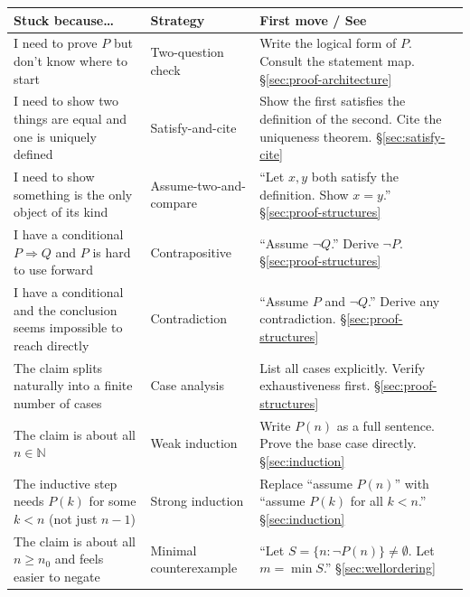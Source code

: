 \begin{center}
\renewcommand{\arraystretch}{1.6}
\begin{tabular}{p{} p{} p{}}
\toprule
\textbf{Stuck because\ldots} &
\textbf{Strategy} &
\textbf{First move / See} \\
\midrule

I need to prove $P$ but don't know where to start &
  Two-question check &
  Write the logical form of $P$. Consult the statement map.
  \S\ref{sec:proof-architecture} \\

I need to show two things are equal and one is uniquely defined &
  Satisfy-and-cite &
  Show the first satisfies the definition of the second.
  Cite the uniqueness theorem.
  \S\ref{sec:satisfy-cite} \\

I need to show something is the only object of its kind &
  Assume-two-and-compare &
  ``Let $x, y$ both satisfy the definition. Show $x = y$.''
  \S\ref{sec:proof-structures} \\

I have a conditional $P \Rightarrow Q$ and $P$ is hard to use forward &
  Contrapositive &
  ``Assume $\neg Q$.'' Derive $\neg P$.
  \S\ref{sec:proof-structures} \\

I have a conditional and the conclusion seems impossible to reach directly &
  Contradiction &
  ``Assume $P$ and $\neg Q$.'' Derive any contradiction.
  \S\ref{sec:proof-structures} \\

The claim splits naturally into a finite number of cases &
  Case analysis &
  List all cases explicitly. Verify exhaustiveness first.
  \S\ref{sec:proof-structures} \\

The claim is about all $n \in \mathbb{N}$ &
  Weak induction &
  Write $P(n)$ as a full sentence. Prove the base case directly.
  \S\ref{sec:induction} \\

The inductive step needs $P(k)$ for some $k < n$ (not just $n-1$) &
  Strong induction &
  Replace ``assume $P(n)$'' with ``assume $P(k)$ for all $k < n$.''
  \S\ref{sec:induction} \\

The claim is about all $n \geq n_0$ and feels easier to negate &
  Minimal counterexample &
  ``Let $S = \{n : \neg P(n)\} \neq \emptyset$. Let $m = \min S$.''
  \S\ref{sec:wellordering} \\


\end{tabular}
\end{center}
